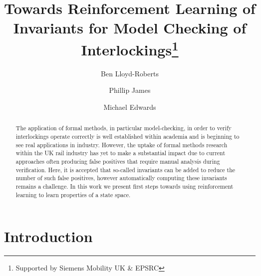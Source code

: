 \documentclass[runningheads]{llncs}
\begin{document}
%
\title{Towards Reinforcement Learning of Invariants for Model Checking of Interlockings\thanks{Supported by Siemens Mobility UK \& EPSRC}}
%
%
\author{Ben Lloyd-Roberts \and
Phillip James \and
Michael Edwards}
%
%


%
\maketitle              %
%
\begin{abstract}
The application of formal methods, in particular model-checking, in order to verify interlockings operate correctly is well established within academia and is beginning to see real applications in industry. However, the uptake of formal methods research within the UK rail industry has yet to make a substantial impact due to current approaches often producing false positives that require manual analysis during verification. Here, it is accepted that so-called invariants can be added to reduce the number of such false positives, however automatically computing these invariants remains a challenge. In this work we present first steps towards using reinforcement learning to learn properties of a state space.

\end{abstract}


\section{Introduction}
\end{document}

